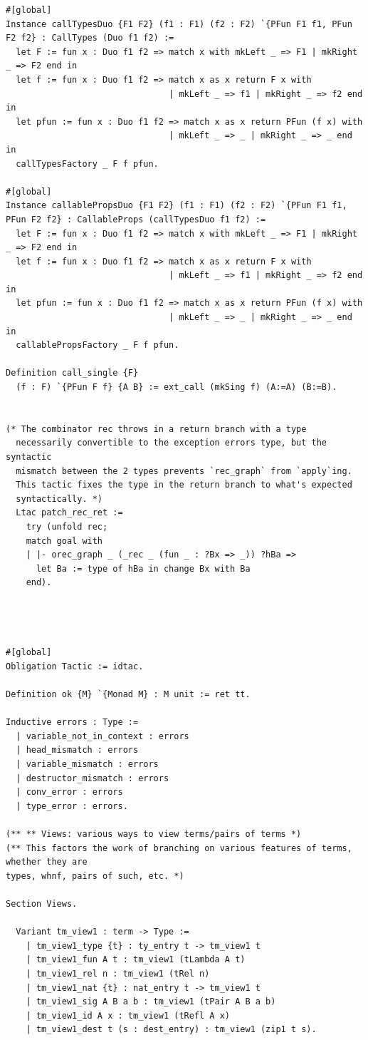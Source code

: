 \documentclass[10pt,a4paper]{amsart}
\begin{document}
\begin{lstlisting}
#[global]
Instance callTypesDuo {F1 F2} (f1 : F1) (f2 : F2) `{PFun F1 f1, PFun F2 f2} : CallTypes (Duo f1 f2) :=
  let F := fun x : Duo f1 f2 => match x with mkLeft _ => F1 | mkRight _ => F2 end in
  let f := fun x : Duo f1 f2 => match x as x return F x with
                                | mkLeft _ => f1 | mkRight _ => f2 end in
  let pfun := fun x : Duo f1 f2 => match x as x return PFun (f x) with
                                | mkLeft _ => _ | mkRight _ => _ end in
  callTypesFactory _ F f pfun.

#[global]
Instance callablePropsDuo {F1 F2} (f1 : F1) (f2 : F2) `{PFun F1 f1, PFun F2 f2} : CallableProps (callTypesDuo f1 f2) :=
  let F := fun x : Duo f1 f2 => match x with mkLeft _ => F1 | mkRight _ => F2 end in
  let f := fun x : Duo f1 f2 => match x as x return F x with
                                | mkLeft _ => f1 | mkRight _ => f2 end in
  let pfun := fun x : Duo f1 f2 => match x as x return PFun (f x) with
                                | mkLeft _ => _ | mkRight _ => _ end in
  callablePropsFactory _ F f pfun.

Definition call_single {F}
  (f : F) `{PFun F f} {A B} := ext_call (mkSing f) (A:=A) (B:=B).


(* The combinator rec throws in a return branch with a type 
  necessarily convertible to the exception errors type, but the syntactic 
  mismatch between the 2 types prevents `rec_graph` from `apply`ing.
  This tactic fixes the type in the return branch to what's expected
  syntactically. *)
  Ltac patch_rec_ret :=
    try (unfold rec;
    match goal with 
    | |- orec_graph _ (_rec _ (fun _ : ?Bx => _)) ?hBa => 
      let Ba := type of hBa in change Bx with Ba
    end).




#[global]
Obligation Tactic := idtac.

Definition ok {M} `{Monad M} : M unit := ret tt.

Inductive errors : Type :=
  | variable_not_in_context : errors
  | head_mismatch : errors
  | variable_mismatch : errors
  | destructor_mismatch : errors
  | conv_error : errors
  | type_error : errors.

(** ** Views: various ways to view terms/pairs of terms *)
(** This factors the work of branching on various features of terms, whether they are
types, whnf, pairs of such, etc. *)

Section Views.

  Variant tm_view1 : term -> Type :=
    | tm_view1_type {t} : ty_entry t -> tm_view1 t
    | tm_view1_fun A t : tm_view1 (tLambda A t)
    | tm_view1_rel n : tm_view1 (tRel n)
    | tm_view1_nat {t} : nat_entry t -> tm_view1 t
    | tm_view1_sig A B a b : tm_view1 (tPair A B a b)
    | tm_view1_id A x : tm_view1 (tRefl A x)
    | tm_view1_dest t (s : dest_entry) : tm_view1 (zip1 t s).


\end{lstlisting}
\end{document}
